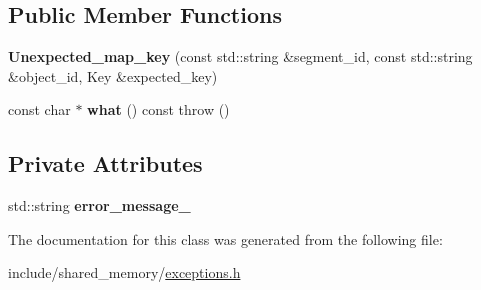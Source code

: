 \subsection*{Public Member Functions}
\begin{DoxyCompactItemize}
\item 
{\bfseries Unexpected\+\_\+map\+\_\+key} (const std\+::string \&segment\+\_\+id, const std\+::string \&object\+\_\+id, Key \&expected\+\_\+key)\hypertarget{classshared__memory_1_1Unexpected__map__key_a6b186f98c6978fb264529381b3174c9d}{}\label{classshared__memory_1_1Unexpected__map__key_a6b186f98c6978fb264529381b3174c9d}

\item 
const char $\ast$ {\bfseries what} () const   throw ()\hypertarget{classshared__memory_1_1Unexpected__map__key_af5cbaa9ae4b6f51f8e201d2984a7d94c}{}\label{classshared__memory_1_1Unexpected__map__key_af5cbaa9ae4b6f51f8e201d2984a7d94c}

\end{DoxyCompactItemize}
\subsection*{Private Attributes}
\begin{DoxyCompactItemize}
\item 
std\+::string {\bfseries error\+\_\+message\+\_\+}\hypertarget{classshared__memory_1_1Unexpected__map__key_a67c2b43bc3b41b5584c7fba92acac5cc}{}\label{classshared__memory_1_1Unexpected__map__key_a67c2b43bc3b41b5584c7fba92acac5cc}

\end{DoxyCompactItemize}


The documentation for this class was generated from the following file\+:\begin{DoxyCompactItemize}
\item 
include/shared\+\_\+memory/\hyperlink{exceptions_8h}{exceptions.\+h}\end{DoxyCompactItemize}
